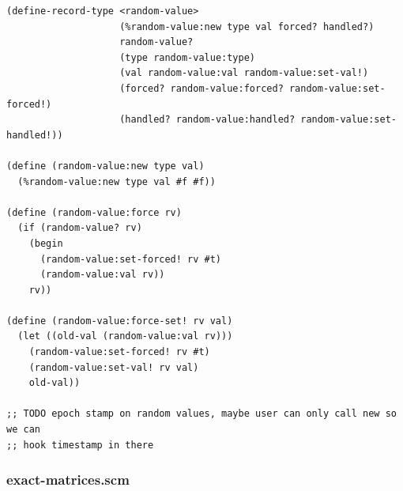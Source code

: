 \documentclass{article}
\begin{document}
\begin{verbatim}
(define-record-type <random-value>
                    (%random-value:new type val forced? handled?)
                    random-value?
                    (type random-value:type)
                    (val random-value:val random-value:set-val!)
                    (forced? random-value:forced? random-value:set-forced!)
                    (handled? random-value:handled? random-value:set-handled!))

(define (random-value:new type val)
  (%random-value:new type val #f #f))

(define (random-value:force rv)
  (if (random-value? rv)
    (begin
      (random-value:set-forced! rv #t)
      (random-value:val rv))
    rv))

(define (random-value:force-set! rv val)
  (let ((old-val (random-value:val rv)))
    (random-value:set-forced! rv #t)
    (random-value:set-val! rv val)
    old-val))

;; TODO epoch stamp on random values, maybe user can only call new so we can
;; hook timestamp in there
\end{verbatim}

\subsubsection{exact-matrices.scm}
\end{document}
